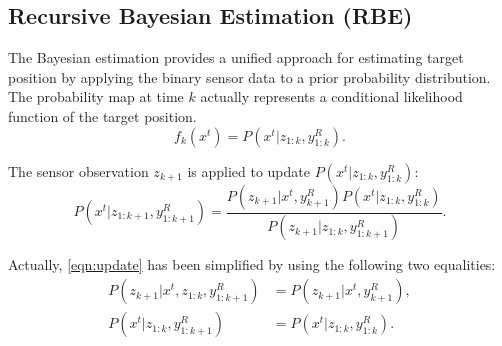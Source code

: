 \documentclass[twocolumn,10pt]{asme2e}
\begin{document}
\subsection*{Recursive Bayesian Estimation (RBE)}
The Bayesian estimation provides a unified approach for estimating target position by applying the binary sensor data to a prior probability distribution. 
The probability map at time $k$ actually represents a conditional likelihood function of the target position.
\begin{equation}\label{eqn:prob_map}
f_k(x^t)=P(x^t|z_{1:k},y^R_{1:k}).
\end{equation}

The sensor observation $z_{k+1}$ is applied to update $P(x^t|z_{1:k},y^R_{1:k})$:
\begin{equation}\label{eqn:update}
P(x^t|z_{1:k+1},y^R_{1:k+1})=\frac{P(z_{k+1}|x^t,y^R_{k+1})P(x^t|z_{1:k},y^R_{1:k})}{P(z_{k+1}|z_{1:k},y^R_{1:k+1})}.
\end{equation}

Actually, \cref{eqn:update} has been simplified by using the following two equalities:
\begin{subequations}
	\begin{align}
	P(z_{k+1}|x^t,z_{1:k},y^R_{1:k+1}) &= P(z_{k+1}|x^t,y^R_{k+1}),\label{eqn:cond_ind1}\\
	P(x^t|z_{1:k},y^R_{1:k+1})&=P(x^t|z_{1:k},y^R_{1:k}).\label{eqn:cond_ind2}
	\end{align}
\end{subequations}
\end{document}
